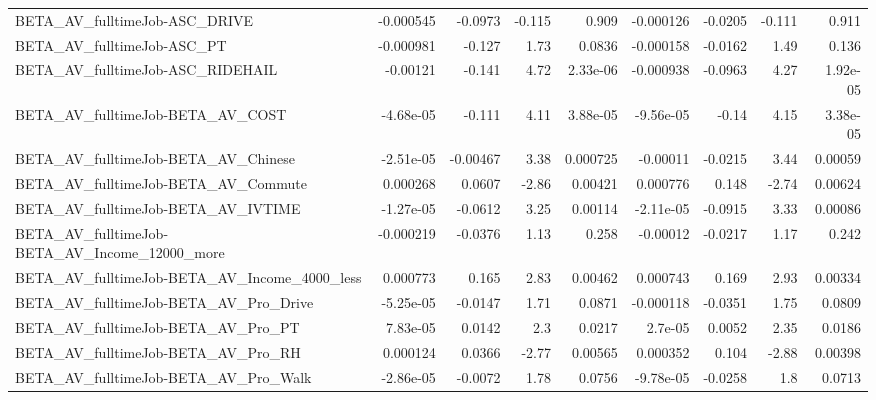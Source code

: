 \begin{tabular}{lrrrrrrrr}
BETA\_AV\_fulltimeJob-ASC\_DRIVE                      &   -0.000545 &      -0.0973 &    -0.115 &    0.909 &  -0.000126 &     -0.0205 &       -0.111 &         0.911 \\
BETA\_AV\_fulltimeJob-ASC\_PT                         &   -0.000981 &       -0.127 &      1.73 &   0.0836 &  -0.000158 &     -0.0162 &         1.49 &         0.136 \\
BETA\_AV\_fulltimeJob-ASC\_RIDEHAIL                   &    -0.00121 &       -0.141 &      4.72 & 2.33e-06 &  -0.000938 &     -0.0963 &         4.27 &      1.92e-05 \\
BETA\_AV\_fulltimeJob-BETA\_AV\_COST                   &   -4.68e-05 &       -0.111 &      4.11 & 3.88e-05 &  -9.56e-05 &       -0.14 &         4.15 &      3.38e-05 \\
BETA\_AV\_fulltimeJob-BETA\_AV\_Chinese                &   -2.51e-05 &     -0.00467 &      3.38 & 0.000725 &   -0.00011 &     -0.0215 &         3.44 &       0.00059 \\
BETA\_AV\_fulltimeJob-BETA\_AV\_Commute                &    0.000268 &       0.0607 &     -2.86 &  0.00421 &   0.000776 &       0.148 &        -2.74 &       0.00624 \\
BETA\_AV\_fulltimeJob-BETA\_AV\_IVTIME                 &   -1.27e-05 &      -0.0612 &      3.25 &  0.00114 &  -2.11e-05 &     -0.0915 &         3.33 &       0.00086 \\
BETA\_AV\_fulltimeJob-BETA\_AV\_Income\_12000\_more      &   -0.000219 &      -0.0376 &      1.13 &    0.258 &   -0.00012 &     -0.0217 &         1.17 &         0.242 \\
BETA\_AV\_fulltimeJob-BETA\_AV\_Income\_4000\_less       &    0.000773 &        0.165 &      2.83 &  0.00462 &   0.000743 &       0.169 &         2.93 &       0.00334 \\
BETA\_AV\_fulltimeJob-BETA\_AV\_Pro\_Drive              &   -5.25e-05 &      -0.0147 &      1.71 &   0.0871 &  -0.000118 &     -0.0351 &         1.75 &        0.0809 \\
BETA\_AV\_fulltimeJob-BETA\_AV\_Pro\_PT                 &    7.83e-05 &       0.0142 &       2.3 &   0.0217 &    2.7e-05 &      0.0052 &         2.35 &        0.0186 \\
BETA\_AV\_fulltimeJob-BETA\_AV\_Pro\_RH                 &    0.000124 &       0.0366 &     -2.77 &  0.00565 &   0.000352 &       0.104 &        -2.88 &       0.00398 \\
BETA\_AV\_fulltimeJob-BETA\_AV\_Pro\_Walk               &   -2.86e-05 &      -0.0072 &      1.78 &   0.0756 &  -9.78e-05 &     -0.0258 &          1.8 &        0.0713 \\

\end{tabular}
